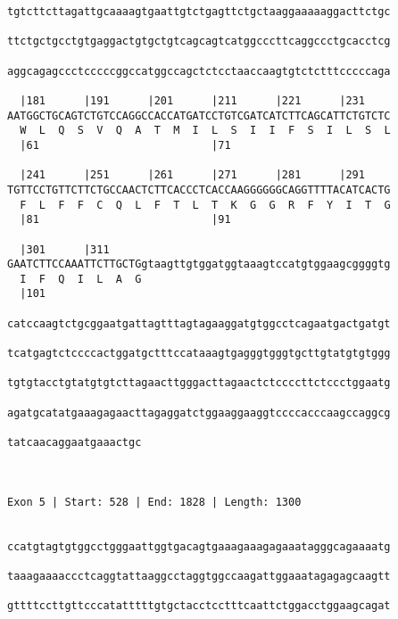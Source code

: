 \documentclass{article}
\begin{document}
\begin{Verbatim}
tgtcttcttagattgcaaaagtgaattgtctgagttctgctaaggaaaaaggacttctgc
                                                            
ttctgctgcctgtgaggactgtgctgtcagcagtcatggcccttcaggccctgcacctcg
                                                            
aggcagagccctcccccggccatggccagctctcctaaccaagtgtctctttcccccaga
                                                            
  |181      |191      |201      |211      |221      |231    
AATGGCTGCAGTCTGTCCAGGCCACCATGATCCTGTCGATCATCTTCAGCATTCTGTCTC
  W  L  Q  S  V  Q  A  T  M  I  L  S  I  I  F  S  I  L  S  L
  |61                           |71                         
  
  |241      |251      |261      |271      |281      |291    
TGTTCCTGTTCTTCTGCCAACTCTTCACCCTCACCAAGGGGGGCAGGTTTTACATCACTG
  F  L  F  F  C  Q  L  F  T  L  T  K  G  G  R  F  Y  I  T  G
  |81                           |91                         
  
  |301      |311                                            
GAATCTTCCAAATTCTTGCTGgtaagttgtggatggtaaagtccatgtggaagcggggtg
  I  F  Q  I  L  A  G                                       
  |101                                                      
  
catccaagtctgcggaatgattagtttagtagaaggatgtggcctcagaatgactgatgt
                                                            
tcatgagtctccccactggatgctttccataaagtgagggtgggtgcttgtatgtgtggg
                                                            
tgtgtacctgtatgtgtcttagaacttgggacttagaactctccccttctccctggaatg
                                                            
agatgcatatgaaagagaacttagaggatctggaaggaaggtccccacccaagccaggcg
                                                            
tatcaacaggaatgaaactgc
                     
                     
 
Exon 5 | Start: 528 | End: 1828 | Length: 1300


ccatgtagtgtggcctgggaattggtgacagtgaaagaaagagaaatagggcagaaaatg
                                                            
taaagaaaaccctcaggtattaaggcctaggtggccaagattggaaatagagagcaagtt
                                                            
gttttccttgttcccatatttttgtgctacctcctttcaattctggacctggaagcagat
                                                            

\end{Verbatim}
\end{document}
